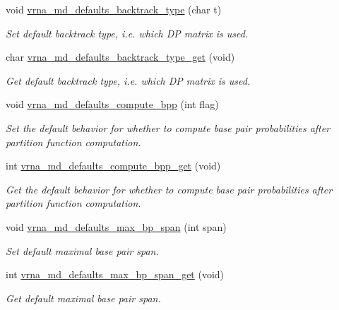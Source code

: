\begin{DoxyCompactItemize}
void \hyperlink{group__model__details_ga68305274de96b56b7799575e222560d8}{vrna\+\_\+md\+\_\+defaults\+\_\+backtrack\+\_\+type} (char t)
\begin{DoxyCompactList}\small\item\em Set default backtrack type, i.\+e. which D\+P matrix is used. \end{DoxyCompactList}\item 
char \hyperlink{group__model__details_ga1425b4ebd0e034dead66d79becd64143}{vrna\+\_\+md\+\_\+defaults\+\_\+backtrack\+\_\+type\+\_\+get} (void)
\begin{DoxyCompactList}\small\item\em Get default backtrack type, i.\+e. which D\+P matrix is used. \end{DoxyCompactList}\item 
void \hyperlink{group__model__details_gaf1b5db10f1f476767f9a95f8a78e3132}{vrna\+\_\+md\+\_\+defaults\+\_\+compute\+\_\+bpp} (int flag)
\begin{DoxyCompactList}\small\item\em Set the default behavior for whether to compute base pair probabilities after partition function computation. \end{DoxyCompactList}\item 
int \hyperlink{group__model__details_gaa3a537e61fbe0518673bf9f73fd820f3}{vrna\+\_\+md\+\_\+defaults\+\_\+compute\+\_\+bpp\+\_\+get} (void)
\begin{DoxyCompactList}\small\item\em Get the default behavior for whether to compute base pair probabilities after partition function computation. \end{DoxyCompactList}\item 
void \hyperlink{group__model__details_ga4c4bc962f09b4480cb8499f1cf8ae4ec}{vrna\+\_\+md\+\_\+defaults\+\_\+max\+\_\+bp\+\_\+span} (int span)
\begin{DoxyCompactList}\small\item\em Set default maximal base pair span. \end{DoxyCompactList}\item 
int \hyperlink{group__model__details_gaa60f989e062fecd4d4bac89c1883da85}{vrna\+\_\+md\+\_\+defaults\+\_\+max\+\_\+bp\+\_\+span\+\_\+get} (void)
\begin{DoxyCompactList}\small\item\em Get default maximal base pair span. \end{DoxyCompactList}\item 

\end{DoxyCompactItemize}
